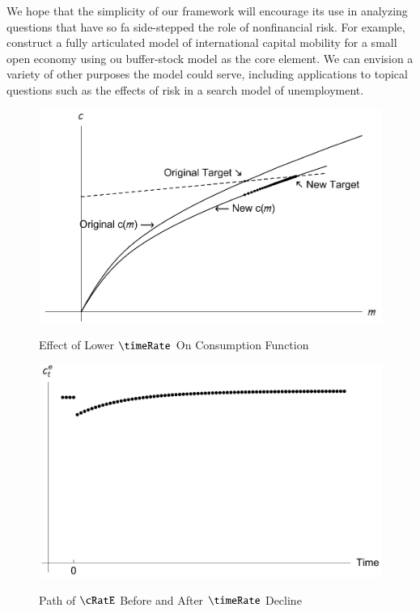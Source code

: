 \documentclass[titlepage,abstract]{\econtex}\newcommand{\texname}{ctDiscrete}
\begin{document}
We hope that the simplicity of our framework will encourage its use 
in analyzing questions that have so fa
side-stepped the role of nonfinancial risk.
For example, \cite{cjSOE} construct a fully articulated model of
international capital mobility for a small open economy using ou
buffer-stock model as the core element.  We can envision a variety of
other purposes the model could serve, including applications to
topical questions such as the effects of risk in a search model of
unemployment.


\clearpage%

\begin{figure}%
\caption{Effect of Lower $\timeRate$ On Consumption Function}%
\includegraphics{./Figures/PhaseDiagramDecreaseThetaPlot}%
\label{fig:DecreaseTheta}%
\end{figure}

\begin{figure}%
\caption{Path of $\cRatE$ Before and After $\timeRate$ Decline}%
\includegraphics{./Figures/cPathAfterThetaDrop}%
\label{fig:cPathAfterThetaDrop}%
\end{figure}
\end{document}
